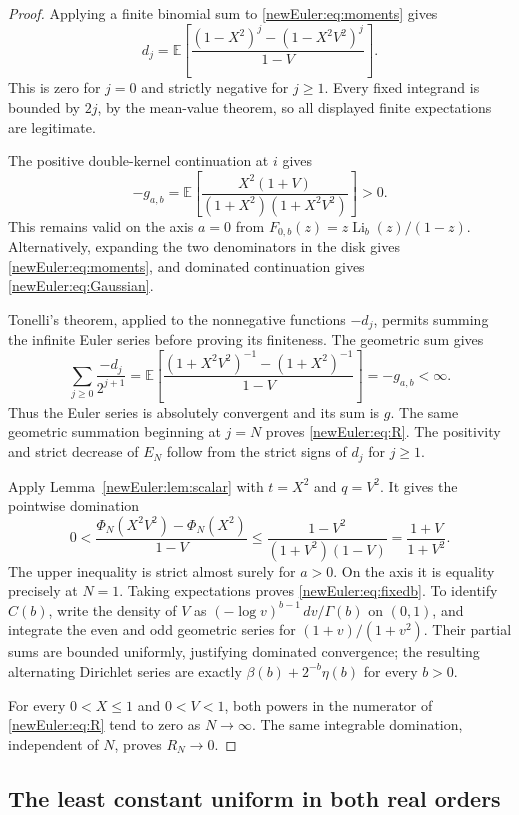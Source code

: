 \documentclass[11pt,letterpaper]{article}
\theoremstyle{definition}
\theoremstyle{remark}
\begin{document}
\begin{proof}
Applying a finite binomial sum to \eqref{newEuler:eq:moments} gives
\[
 d_j=\mathbb E\!\left[
  \frac{(1-X^2)^j-(1-X^2V^2)^j}{1-V}\right].
\]
This is zero for $j=0$ and strictly negative for $j\ge1$. Every
fixed integrand is bounded by $2j$, by the mean-value theorem, so
all displayed finite expectations are legitimate.

The positive double-kernel continuation at $i$ gives
\begin{equation}\label{newEuler:eq:Gaussian}
 -g_{a,b}=\mathbb E\!\left[
 \frac{X^2(1+V)}{(1+X^2)(1+X^2V^2)}\right]>0.
\end{equation}
This remains valid on the axis $a=0$ from
$F_{0,b}(z)=z\operatorname{Li}_b(z)/(1-z)$.
Alternatively, expanding the two denominators in the disk gives
\eqref{newEuler:eq:moments}, and dominated continuation gives
\eqref{newEuler:eq:Gaussian}.

Tonelli's theorem, applied to the nonnegative functions $-d_j$, permits
summing the infinite Euler series before proving its finiteness. The
geometric sum gives
\[
 \sum_{j\ge0}\frac{-d_j}{2^{j+1}}
 =\mathbb E\!\left[
  \frac{(1+X^2V^2)^{-1}-(1+X^2)^{-1}}{1-V}\right]
 =-g_{a,b}<\infty.
\]
Thus the Euler series is absolutely convergent and its sum is $g$.
The same geometric summation beginning at $j=N$ proves
\eqref{newEuler:eq:R}. The positivity and strict decrease of $E_N$
follow from the strict signs of $d_j$ for $j\ge1$.

Apply Lemma~\ref{newEuler:lem:scalar} with $t=X^2$ and $q=V^2$.
It gives the pointwise domination
\[
 0<\frac{\Phi_N(X^2V^2)-\Phi_N(X^2)}{1-V}
 \le\frac{1-V^2}{(1+V^2)(1-V)}
 =\frac{1+V}{1+V^2}.
\]
The upper inequality is strict almost surely for $a>0$. On the axis
it is equality precisely at $N=1$. Taking expectations proves
\eqref{newEuler:eq:fixedb}. To identify $C(b)$, write the density
of $V$ as $(-\log v)^{b-1}\,dv/\Gamma(b)$ on $(0,1)$, and
integrate the even and odd geometric series for $(1+v)/(1+v^2)$.
Their partial sums are bounded uniformly, justifying dominated
convergence; the resulting alternating Dirichlet series are exactly
$\beta(b)+2^{-b}\eta(b)$ for every $b>0$.

For every $0<X\le1$ and $0<V<1$, both powers in the numerator of
\eqref{newEuler:eq:R} tend to zero as $N\to\infty$.
The same integrable domination, independent of $N$, proves $R_N\to0$.
\end{proof}

\subsection{The least constant uniform in both real orders}
\end{document}
